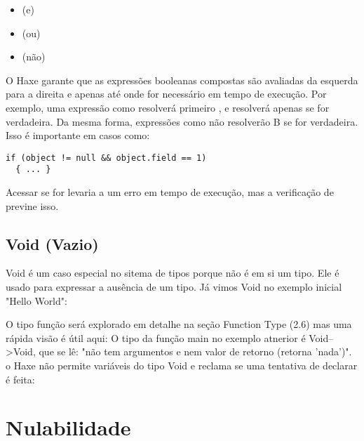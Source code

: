 \begin{itemize}
	\item \expr{\&\&} (e)
	\item \expr{||} (ou)
	\item \expr{!} (não)
\end{itemize}

O Haxe garante que as expressões booleanas compostas são avaliadas da esquerda para a direita e apenas até onde for necessário em tempo de execução. Por exemplo, uma expressão como resolverá primeiro , e resolverá  apenas se  for verdadeira. Da mesma forma, expressões como  não resolverão B se  for verdadeira. Isso é importante em casos como:

\begin{lstlisting}
if (object != null && object.field == 1)
  { ... }
\end{lstlisting}

Acessar  se  for  levaria a um erro em tempo de execução, mas a verificação de  previne isso.



\subsection {Void (Vazio)}
\label{types-void}


Void é um caso especial no sitema de tipos porque não é em si um tipo. Ele é usado para expressar a ausência de um tipo. Já vimos Void no exemplo inicial "Hello World":

O tipo função será explorado em detalhe na seção Function Type (2.6) mas uma rápida visão é útil aqui: O tipo da função main no exemplo atnerior é Void-->Void, que se lê: "não tem argumentos e nem valor de retorno (retorna 'nada')". o Haxe não permite variáveis do tipo Void e reclama se uma tentativa de declarar é feita:

\section{Nulabilidade}

